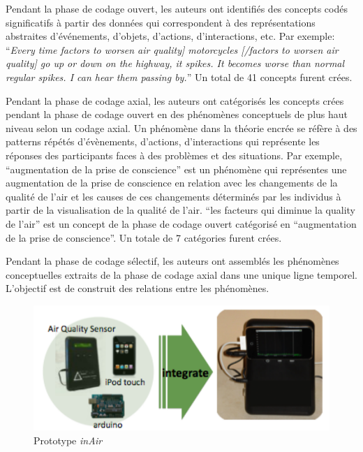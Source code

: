 \documentclass[10pt,a5paper,twoside]{article}
\begin{document}
Pendant la phase de codage ouvert, les auteurs ont identifiés des
concepts codés significatifs à partir des données qui correspondent à
des représentations abstraites d'événements, d'objets, d'actions,
d'interactions, etc. Par exemple: ``\emph{Every time factors to worsen
air quality{]} motorcycles {[}/factors to worsen air quality{]} go up or
down on the highway, it spikes. It becomes worse than normal regular
spikes. I can hear them passing by.}'' Un total de 41 concepts furent
crées.

Pendant la phase de codage axial, les auteurs ont catégorisés les
concepts crées pendant la phase de codage ouvert en des phénomènes
conceptuels de plus haut niveau selon un codage axial. Un phénomène dans
la théorie encrée se réfère à des patterns répétés d'évènements,
d'actions, d'interactions qui représente les réponses des participants
faces à des problèmes et des situations. Par exemple, ``augmentation de
la prise de conscience'' est un phénomène qui représentes une
augmentation de la prise de conscience en relation avec les changements
de la qualité de l'air et les causes de ces changements déterminés par
les individus à partir de la visualisation de la qualité de l'air. ``les
facteurs qui diminue la quality de l'air'' est un concept de la phase de
codage ouvert catégorisé en ``augmentation de la prise de conscience''.
Un totale de 7 catégories furent crées.

Pendant la phase de codage sélectif, les auteurs ont assemblés les
phénomènes conceptuelles extraits de la phase de codage axial dans une
unique ligne temporel. L'objectif est de construit des relations entre
les phénomènes.

\begin{figure}
\centering
\includegraphics[]{images/inair-screenshot3.png}
\caption{Prototype \emph{inAir}}\label{fig:inair1}
\end{figure}
\end{document}
